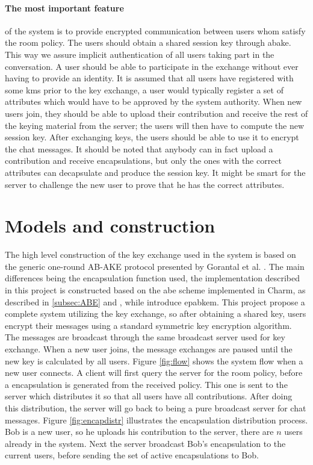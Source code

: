 \paragraph{The most important feature} of the system is to provide encrypted communication between users whom satisfy the room policy. The users should obtain a shared session key through \gls{abake}. This way we assure implicit authentication of all users taking part in the conversation. A user should be able to participate in the exchange without ever having to provide an identity. It is assumed that all users have registered with some \gls{kms} prior to the key exchange, a user would typically register a set of attributes which would have to be approved by the system authority. When new users join, they should be able to upload their contribution and receive the rest of the keying material from the server; the users will then have to compute the new session key. After exchanging keys, the users should be able to use it to encrypt the chat messages. It should be noted that anybody can in fact upload a contribution and receive encapsulations, but only the ones with the correct attributes can decapsulate and produce the session key. It might be smart for the server to challenge the new user to prove that he has the correct attributes.


\section{Models and construction}
The high level construction of the key exchange used in the system is based on the generic one-round AB-AKE protocol presented by Gorantal et al. \cite{gorantla2010attribute}. The main differences being the encapsulation function used, the implementation described in this project is constructed based on the \gls{abe} scheme implemented in Charm, as described in \ref{subsec:ABE} and \cite{abe_waters09}, while \cite{gorantla2010attribute} introduce \gls{epabkem}. This project propose a complete system utilizing the key exchange, so after obtaining a shared key, users encrypt their messages using a standard symmetric key encryption algorithm. The messages are broadcast through the same broadcast server used for key exchange. When a new user joins, the message exchanges are paused until the new key is calculated by all users. Figure \ref{fig:flow} shows the system flow when a new user connects. A client will first query the server for the room policy, before a encapsulation is generated from the received policy. This one is sent to the server which distributes it so that all users have all contributions. After doing this distribution, the server will go back to being a pure broadcast server for chat messages. Figure \ref{fig:encapdistr} illustrates the encapsulation distribution process. Bob is a new user, so he uploads his contribution to the server, there are $n$ users already in the system. Next the server broadcast Bob's encapsulation to the current users, before sending the set of active encapsulations to Bob.



